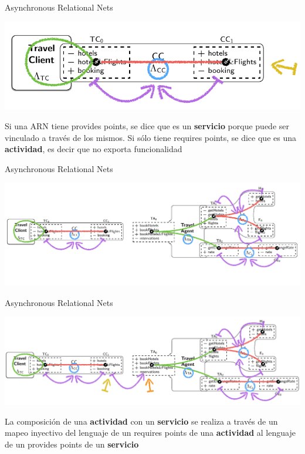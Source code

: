 \documentclass[10pt,xcolor={table,dvipsnames},t]{beamer}
\begin{document}
\begin{frame}{Asynchronous Relational Nets \cite{fiadeiro:fase2011}}
 \vspace{\fill}
\begin{center}
\includegraphics[scale=0.5]{images/ARN5.png}
\end{center}
 \vspace{\fill}
Si una ARN tiene \textcolor{prov}{provides points}, se dice que es un \textbf{servicio} porque puede ser vinculado a través de los mismos. Si sólo tiene \textcolor{req}{requires points}, se dice que es una \textbf{actividad}, es decir que no exporta funcionalidad
 \vspace{\fill}
\end{frame}


\begin{frame}{Asynchronous Relational Nets \cite{fiadeiro:fase2011}}
 \vspace{\fill}
 \begin{center}
\includegraphics[scale=0.45]{images/ARN6.png} 
 \end{center}
 \vspace{\fill}
\end{frame}


\begin{frame}{Asynchronous Relational Nets \cite{fiadeiro:fase2011}}
 \vspace{\fill}
\begin{center}
\includegraphics[scale=0.39]{images/ARN7.png}
\end{center}
 \vspace{\fill}
La composición de una \textbf{actividad} con un \textbf{servicio} se realiza a través de un \textcolor{map}{mapeo inyectivo} del lenguaje de un \textcolor{req}{requires points} de una \textbf{actividad} al lenguaje de un \textcolor{prov}{provides points} de un \textbf{servicio}
 \vspace{\fill}
\end{frame}
\end{document}

